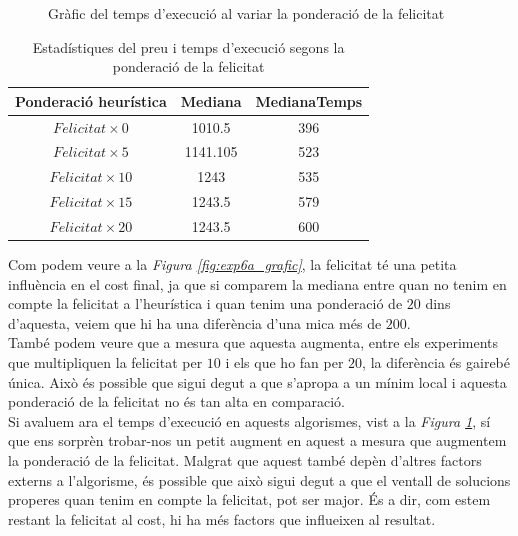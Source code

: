 \documentclass[a4paper]{article}
\begin{document}
\begin{figure}[H]
\begin{minipage}{0.45\textwidth}
			\caption{Gràfic del temps d'execució al variar la ponderació de la felicitat}
			\label{fig:exp6b_grafic}
		\end{minipage}
	\end{figure}
	
	\begin{table}[H]
		\centering
		\begin{tabular}{|c|c|c|}
			\hline
			\textbf{Ponderació heurística} & \textbf{Mediana} & \textbf{MedianaTemps} \\
			\hline
			$Felicitat \times 0$ & 1010.5 & 396\\
			\hline
			$Felicitat \times 5$ & 1141.105 & 523\\
			\hline
			$Felicitat \times 10$ & 1243 & 535\\
			\hline
			$Felicitat \times 15$ & 1243.5 & 579\\
			\hline
			$Felicitat \times 20$ & 1243.5 & 600\\
			\hline
		\end{tabular}
		\caption{Estadístiques del preu i temps d'execució segons la ponderació de la felicitat}
		\label{tab:exp6_estadisticas}
	\end{table}
	
	Com podem veure a la \textit{Figura \ref{fig:exp6a_grafic}}, la felicitat té una petita influència en el cost final, ja que si comparem la mediana entre quan no tenim en compte la felicitat a l'heurística i quan tenim una ponderació de $20$ dins d'aquesta, veiem que hi ha una diferència d'una mica més de $200$. \\
	
	També podem veure que a mesura que aquesta augmenta, entre els experiments que multipliquen la felicitat per $10$ i els que ho fan per $20$, la diferència és gairebé única. Això és possible que sigui degut a que s'apropa a un mínim local i aquesta ponderació de la felicitat no és tan alta en comparació. \\
	
	Si avaluem ara el temps d'execució en aquests algorismes, vist a la \textit{Figura \ref{fig:exp6b_grafic}}, sí que ens sorprèn trobar-nos un petit augment en aquest a mesura que augmentem la ponderació de la felicitat. Malgrat que aquest també depèn d'altres factors externs a l'algorisme, és possible que això sigui degut a que el ventall de solucions properes quan tenim en compte la felicitat, pot ser major. És a dir, com estem restant la felicitat al cost, hi ha més factors que influeixen al resultat. \\
	
\end{document}
